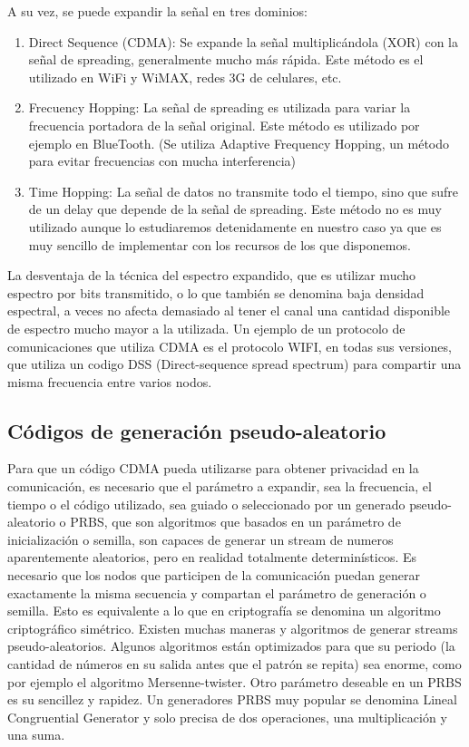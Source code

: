 A su vez, se puede expandir la señal en tres dominios:
\begin{enumerate} 
\item Direct Sequence (CDMA): Se expande la señal multiplicándola (XOR) con la señal de spreading, generalmente mucho más rápida. Este método es el utilizado en WiFi y WiMAX, redes 3G de celulares, etc.
\item Frecuency Hopping: La señal de spreading es utilizada para variar la frecuencia portadora de la señal original. Este método es utilizado por ejemplo en BlueTooth. (Se utiliza Adaptive Frequency Hopping, un método para evitar frecuencias con mucha interferencia)
\item Time Hopping: La señal de datos no transmite todo el tiempo, sino que sufre de un delay que depende de la señal de spreading. Este método no es muy utilizado aunque lo estudiaremos detenidamente en nuestro caso ya que es muy sencillo de implementar con los recursos de los que disponemos.
\end{enumerate} 


La desventaja de la técnica del espectro expandido, que es utilizar mucho espectro por bits transmitido, o lo que también se denomina baja densidad espectral, a veces no afecta demasiado al tener el canal una cantidad disponible de espectro mucho mayor a la utilizada. Un ejemplo de un protocolo de comunicaciones que utiliza CDMA es el protocolo WIFI, en todas sus versiones, que utiliza un codigo DSS (Direct-sequence spread spectrum) para compartir una misma frecuencia entre varios nodos.

\subsection{Códigos de generación pseudo-aleatorio}
\label{PRNGs} 
Para que un código CDMA pueda utilizarse para obtener privacidad en la comunicación, es necesario que el parámetro a expandir, sea la frecuencia, el tiempo o el código utilizado, sea guiado o seleccionado por un generado pseudo-aleatorio o PRBS, que son algoritmos que basados en un parámetro de inicialización o semilla, son capaces de generar un stream de numeros aparentemente aleatorios, pero en realidad totalmente determinísticos. 
Es necesario que los nodos que participen de la comunicación puedan generar exactamente la misma secuencia y compartan el parámetro de generación o semilla. Esto es equivalente a lo que en criptografía se denomina un algoritmo criptográfico simétrico.
Existen muchas maneras y algoritmos de generar streams pseudo-aleatorios. Algunos algoritmos están optimizados para que su periodo (la cantidad de números en su salida antes que el patrón se repita) sea enorme, como por ejemplo el algoritmo Mersenne-twister.
Otro parámetro deseable en un PRBS es su sencillez y rapidez. Un generadores PRBS muy popular se denomina Lineal Congruential Generator y solo precisa de dos operaciones, una multiplicación y una suma.


